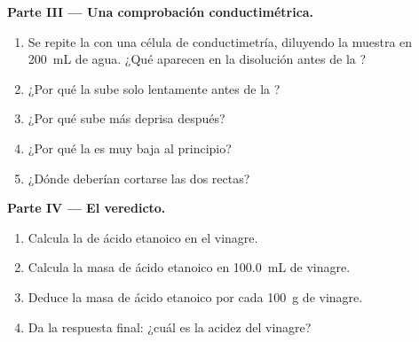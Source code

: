 \begin{problem}
\medskip
\noindent\textbf{Parte III --- Una comprobación conductimétrica.}
\begin{enumerate}[resume]
  \item Se repite la  con una célula de conductimetría,
        diluyendo la muestra en \qty{200}{mL} de agua. ¿Qué 
        aparecen en la disolución antes de la ?
  \item ¿Por qué la  sube solo lentamente antes de la
        ?
  \item ¿Por qué sube más deprisa después?
  \item ¿Por qué la  es muy baja al principio?
  \item ¿Dónde deberían cortarse las dos rectas?
\end{enumerate}

\medskip
\noindent\textbf{Parte IV --- El veredicto.}
\begin{enumerate}[resume]
  \item Calcula la  de ácido etanoico en el vinagre.
  \item Calcula la masa de ácido etanoico en \qty{100.0}{mL} de vinagre.
  \item Deduce la masa de ácido etanoico por cada \qty{100}{g} de
        vinagre.
  \item Da la respuesta final: ¿cuál es la acidez del vinagre?
\end{enumerate}
\end{problem}
